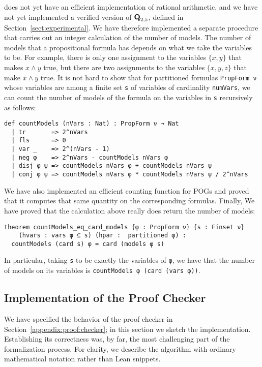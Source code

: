 \lean{} does not yet have an efficient implementation of rational arithmetic, and
we have not yet implemented a verified version of $\textbf{Q}_{2,5}$,
defined in Section~\ref{sect:experimental}.
We have therefore implemented a separate procedure that carries out an integer
calculation of the number of models.
The number of models that a propositional formula has depends on what we take the
variables to be. For example, there is only one assignment to the variables
$\{ x, y \}$ that makes $x \wedge y$ true, but there are two assignments to the
variables $\{ x, y, z \}$ that make $x \wedge y$ true.
It is not hard to show that for partitioned formulas \lstinline{PropForm ν} whose
variables are among a finite set \lstinline{s} of variables of cardinality \lstinline{numVars},
we can count the number of models of the formula on the variables in \lstinline{s}
recursively as follows:
\begin{lstlisting}
def countModels (nVars : Nat) : PropForm ν → Nat
  | tr       => 2^nVars
  | fls      => 0
  | var _    => 2^(nVars - 1)
  | neg φ    => 2^nVars - countModels nVars φ
  | disj φ ψ => countModels nVars φ + countModels nVars ψ
  | conj φ ψ => countModels nVars φ * countModels nVars ψ / 2^nVars
\end{lstlisting}
We have also implemented an efficient counting function for POGs and proved that
it computes that same quantity on the corresponding formulas.
Finally,
We have proved that the calculation above really does
return the number of models:
\begin{lstlisting}
theorem countModels_eq_card_models {φ : PropForm ν} {s : Finset ν}
    (hvars : vars φ ⊆ s) (hpar :  partitioned φ) :
  countModels (card s) φ = card (models φ s)
\end{lstlisting}
In particular, taking \lstinline{s} to be exactly the variables of \lstinline{φ},
we have that the number of models on its variables is \lstinline{countModels φ (card (vars φ))}.

\subsection{Implementation of the Proof Checker}

We have specified the behavior of the proof checker in Section~\ref{appendix:proof:checker};
in this section we sketch the implementation.
Establishing its correctness was, by far, the most challenging part of the formalization
process.
For clarity, we describe the algorithm with ordinary mathematical notation rather than
Lean snippets.

